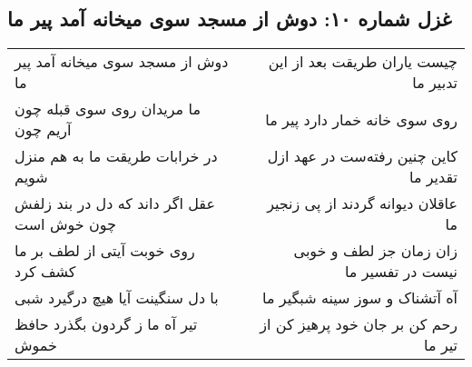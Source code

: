 \begin{center}
\section*{غزل شماره ۱۰: دوش از مسجد سوی میخانه آمد پیر ما}
\label{sec:sh010}
\begin{longtable}{l p{0.5cm} r}
دوش از مسجد سوی میخانه آمد پیر ما
&&
چیست یاران طریقت بعد از این تدبیر ما
\\
ما مریدان روی سوی قبله چون آریم چون
&&
روی سوی خانه خمار دارد پیر ما
\\
در خرابات طریقت ما به هم منزل شویم
&&
کاین چنین رفته‌ست در عهد ازل تقدیر ما
\\
عقل اگر داند که دل در بند زلفش چون خوش است
&&
عاقلان دیوانه گردند از پی زنجیر ما
\\
روی خوبت آیتی از لطف بر ما کشف کرد
&&
زان زمان جز لطف و خوبی نیست در تفسیر ما
\\
با دل سنگینت آیا هیچ درگیرد شبی
&&
آه آتشناک و سوز سینه شبگیر ما
\\
تیر آه ما ز گردون بگذرد حافظ خموش
&&
رحم کن بر جان خود پرهیز کن از تیر ما
\\
\end{longtable}
\end{center}
